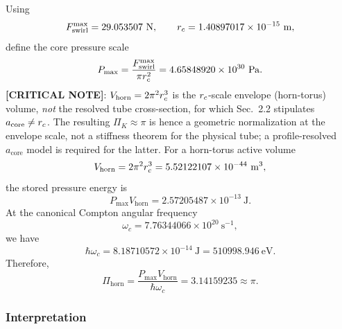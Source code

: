         Using
        \[
            \Fswirlmax = 29.053507\ \mathrm{N},
            \qquad
            \rc = 1.40897017\times10^{-15}\ \mathrm{m},
        \]
        define the core pressure scale
        \begin{equation}
            P_{\max}
            =
            \frac{F_{\text{swirl}}^{\max}}{\pi r_c^2}
            =
            4.65848920\times10^{30}\ \mathrm{Pa}.
            \label{eq:Pmax_numeric}
        \end{equation}
        \textbf{[CRITICAL NOTE]}: $V_{\mathrm{horn}}=2\pi^2r_c^3$ is the $r_c$-scale envelope (horn-torus) volume, \emph{not} the resolved tube cross-section, for which Sec.~2.2 stipulates $a_{\mathrm{core}}\neq r_c$. The resulting $\Pi_K\approx\pi$ is hence a geometric normalization at the envelope scale, not a stiffness theorem for the physical tube; a profile-resolved $a_{\mathrm{core}}$ model is required for the latter.
        For a horn-torus active volume
        \begin{equation}
            V_{\mathrm{horn}}
            =
            2\pi^2 r_c^3
            =
            5.52122107\times10^{-44}\ \mathrm{m^3},
            \label{eq:horn_volume_numeric}
        \end{equation}
        the stored pressure energy is
        \begin{equation}
            P_{\max}V_{\mathrm{horn}}
            =
            2.57205487\times10^{-13}\ \mathrm{J}.
            \label{eq:pressure_energy_numeric}
        \end{equation}
        At the canonical Compton angular frequency
        \[
            \omega_c
            =
            7.76344066\times10^{20}\ \mathrm{s^{-1}},
        \]
        we have
        \begin{equation}
            \hbar\omega_c
            =
            8.18710572\times10^{-14}\ \mathrm{J}
            =
            510998.946\ \mathrm{eV}.
            \label{eq:hbarOmega_numeric}
        \end{equation}
        Therefore,
        \begin{equation}
            \Pi_{\mathrm{horn}}
            =
            \frac{P_{\max}V_{\mathrm{horn}}}
            {\hbar\omega_c}
            =
            3.14159235
            \approx \pi.
            \label{eq:Pi_horn_numeric}
        \end{equation}
    
    \subsubsection*{Interpretation}
        
